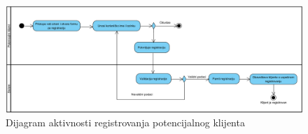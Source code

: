 \begin{figure}[H]
\begin{center}
\includegraphics[width=\textwidth]{Pictures/activity_client_registration.png}
\end{center}
    \caption{Dijagram aktivnosti registrovanja potencijalnog klijenta}
\label{fig:ActivitySelectMealPlan}
\end{figure}